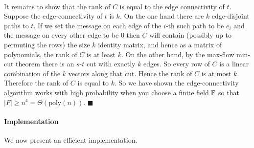 \documentclass[letterpaper,12pt,oneside,onecolumn]{article}
\begin{document}
\paragraph{}
It remains to show that the rank of $C$ is equal to the edge connectivity of $t$. Suppose the edge-connectivity of $t$ is $k$. On the one hand there are $k$ edge-disjoint paths to $t$. If we set the message on each edge of the $i$-th such path to be $e_i$ and the message on every other edge to be $0$ then $C$ will contain (possibly up to permuting the rows) the size $k$ identity matrix, and hence as a matrix of polynomials, the rank of $C$ is at least $k$. On the other hand, by the max-flow min-cut theorem there is an $s$-$t$ cut with exactly $k$ edges. So every row of $C$ is a linear combination of the $k$ vectors along that cut. Hence the rank of $C$ is at most $k$. Therefore the rank of $C$ is equal to $k$. So we have shown the edge-connectivity algorithm works with high probability when you choose a finite field $\mathbb{F}$ so that $|F| \geq n^4 = \Theta(\text{poly}(n))$. $\blacksquare$
\paragraph{Implementation}
We now present an efficient implementation.
\end{document}
